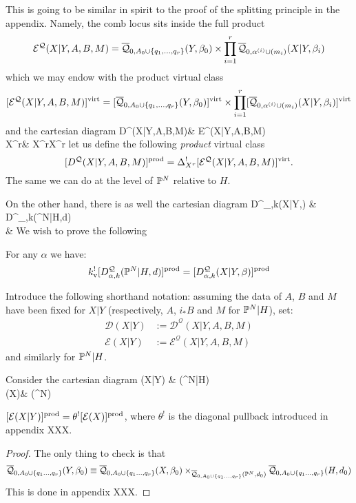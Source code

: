 This is going to be similar in spirit to the proof of the splitting principle in the appendix. Namely, the comb locus sits inside the full product
\begin{equation*} \mathcal E^{\mathcal{Q}}(X|Y,A,B,M) = \overline{\mathcal Q}_{0,A_0 \cup \{q_1, \ldots, q_r\}}(Y,\beta_0) \times \prod_{i=1}^r \overline{\mathcal Q}_{0,\alpha^{(i)}\cup (m_i)}(X|Y,\beta_i) \end{equation*}
which we may endow with the product virtual class
\begin{equation*} [\mathcal E^{\mathcal{Q}}(X|Y,A,B,M)]^{\operatorname{virt}} = [\overline{\mathcal Q}_{0,A_0 \cup \{q_1, \ldots, q_r\}}(Y,\beta_0)]^{\operatorname{virt}} \times \prod_{i=1}^r [\overline{\mathcal Q}_{0,\alpha^{(i)}\cup (m_i)}(X|Y,\beta_i)]^{\operatorname{virt}} \end{equation*}
and the cartesian diagram
\bcd
\mathcal D^{}(X|Y,A,B,M)\ar[r]\ar[d] & \mathcal E^{}(X|Y,A,B,M)\ar[d] \\
X^r\ar[r,"\Delta_{X^r}"] & X^r\times X^r
\ecd
let us define the following \emph{product} virtual class
\[
 [D^{\mathcal{Q}}(X|Y,A,B,M)]^{\operatorname{prod}}=\Delta_{X^r}^![\mathcal E^{\mathcal{Q}}(X|Y,A,B,M)]^{\operatorname{virt}}.
\]
The same we can do at the level of $\mathbb P^N$ relative to $H$.

On the other hand, there is as well the cartesian diagram
\bcd
D^_{\alpha,k}(X|Y,\beta) \ar[r,"k_{|D}"] \ar[d]  & D^_{\alpha,k}(\PP^N|H,d) \ar[d] \\
 \ar[r,"k"] & 
\ecd
We wish to prove the following
\begin{lem} \label{Comb loci pull back} For any $\alpha$ we have:
\begin{equation*} k_{\text{v}}^! [D^\mathcal{Q}_{\alpha,k}(\mathbb P^N|H,d)]^{\operatorname{prod}} = [D^\mathcal{Q}_{\alpha,k}(X|Y,\beta)]^{\operatorname{prod}} \end{equation*} \end{lem}

Introduce the following shorthand notation: assuming the data of $A$, $B$ and $M$ have been fixed for $X|Y$ (respectively, $A$, $i_*B$ and $M$ for $\mathbb P^N|H$), set:
\begin{align*}
\mathcal{D}(X|Y) & := \mathcal D^{\mathcal{Q}}(X|Y,A,B,M) \\
\mathcal{E}(X|Y) & := \mathcal E^{\mathcal{Q}}(X|Y,A,B,M)
\end{align*}
and similarly for $\mathbb P^N|H$.

Consider the cartesian diagram
\bcd
{}(X|Y) \ar[d]\ar[r] & (\PP^N|H)\ar[d,"\theta"] \\
(X)\ar[r] & (\PP^N)
\ecd
\begin{lemma}
 $[\mathcal{E}(X|Y)]^{\operatorname{prod}}=\theta^![\mathcal{E}(X)]^{\operatorname{prod}}$, where $\theta^!$ is the diagonal pullback introduced in appendix XXX.
\end{lemma}
\begin{proof}
 The only thing to check is that
 \[
 \overline{\mathcal Q}_{0,A_0\cup\{q_1\ldots,q_r\}}(Y,\beta_0) \equiv \overline{\mathcal Q}_{0,A_0\cup\{q_1\ldots,q_r\}}(X,\beta_0)\times_{\overline{\mathcal Q}_{0,A_0\cup\{q_1\ldots,q_r\}}(\mathbb P^N,d_0)} \overline{\mathcal Q}_{0,A_0\cup\{q_1\ldots,q_r\}}(H,d_0)
 \]
 This is done in appendix XXX.
\end{proof}

